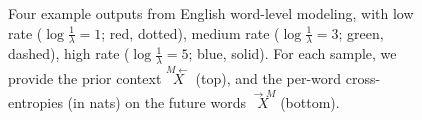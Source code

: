 \documentclass[entropy,article,submit,moreauthors,pdftex,10pt,a4paper]{Definitions/mdpi}
\newif \ifcomment
\newcommand\rljf[1]{\ifcomment{{\color{blue}(#1)}}\else{}\fi}
\newcommand{\finitefuture}{\stackrel{\rightarrow \scriptscriptstyle{M}}{X}}
\newcommand{\finitepast}{\stackrel{\scriptscriptstyle{M}\leftarrow}{X}}%
\begin{document}
\begin{figure}
	\caption{Four example outputs from English word-level modeling, with low rate ($\log \frac{1}{\lambda} = 1$; red, dotted), medium rate ($\log \frac{1}{\lambda} = 3$; green, dashed), high rate ($\log \frac{1}{\lambda} = 5$; blue, solid). For each sample, we provide the prior context $\finitepast$ (top), and the per-word cross-entropies (in nats) on the future words $\finitefuture$ (bottom). \rljf{Figure needs y axis label and a legend to explain the meanings of the different colors}
	}\label{fig:samples-ptb}
\end{figure}











\end{document}
